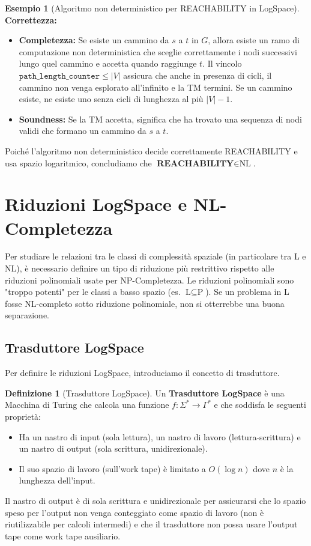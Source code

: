 \documentclass[a4paper]{article}
\theoremstyle{definition} %
\newtheorem{definition}{Definizione}[section]
\newtheorem{example}{Esempio}[section]
\begin{document}
\begin{example}[Algoritmo non deterministico per REACHABILITY in LogSpace]
\textbf{Correttezza:}
\begin{itemize}
    \item \textbf{Completezza:} Se esiste un cammino da $s$ a $t$ in $G$, allora esiste un ramo di computazione non deterministica che sceglie correttamente i nodi successivi lungo quel cammino e accetta quando raggiunge $t$. Il vincolo $\texttt{path\_length\_counter} \leq |V|$ assicura che anche in presenza di cicli, il cammino non venga esplorato all'infinito e la TM termini. Se un cammino esiste, ne esiste uno senza cicli di lunghezza al più $|V|-1$.
    \item \textbf{Soundness:} Se la TM accetta, significa che ha trovato una sequenza di nodi validi che formano un cammino da $s$ a $t$.
\end{itemize}
Poiché l'algoritmo non deterministico decide correttamente REACHABILITY e usa spazio logaritmico, concludiamo che $\textbf{REACHABILITY} \in \text{NL}$.
\end{example}

\section{Riduzioni LogSpace e NL-Completezza}

Per studiare le relazioni tra le classi di complessità spaziale (in particolare tra L e NL), è necessario definire un tipo di riduzione più restrittivo rispetto alle riduzioni polinomiali usate per NP-Completezza. Le riduzioni polinomiali sono "troppo potenti" per le classi a basso spazio (es. $\text{L} \subseteq \text{P}$). Se un problema in L fosse NL-completo sotto riduzione polinomiale, non si otterrebbe una buona separazione.

\subsection{Trasduttore LogSpace}

Per definire le riduzioni LogSpace, introduciamo il concetto di trasduttore.

\begin{definition}[Trasduttore LogSpace]
Un \textbf{Trasduttore LogSpace} è una Macchina di Turing che calcola una funzione $f: \Sigma^* \to \Gamma^*$ e che soddisfa le seguenti proprietà:
\begin{itemize}
    \item Ha un nastro di input (sola lettura), un nastro di lavoro (lettura-scrittura) e un nastro di output (sola scrittura, unidirezionale).
    \item Il suo spazio di lavoro (sull'work tape) è limitato a $O(\log n)$ dove $n$ è la lunghezza dell'input.
\end{itemize}
\end{definition}
Il nastro di output è di sola scrittura e unidirezionale per assicurarsi che lo spazio speso per l'output non venga conteggiato come spazio di lavoro (non è riutilizzabile per calcoli intermedi) e che il trasduttore non possa usare l'output tape come work tape ausiliario.
\end{document}
